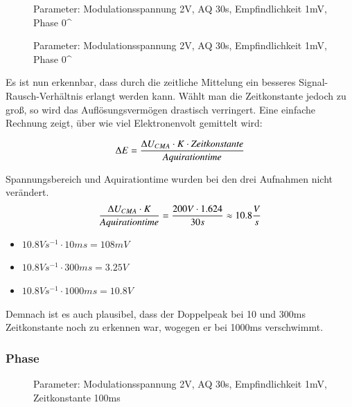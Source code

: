 		\begin{figure}[H]
			\center
			
			\caption{\centering Parameter: Modulationsspannung 2V, AQ 30s, Empfindlichkeit 1mV, Phase 0^\circ}
		\end{figure}

		\begin{figure}[H]
			\center
			
			\caption{\centering Parameter: Modulationsspannung 2V, AQ 30s, Empfindlichkeit 1mV, Phase 0^\circ}
		\end{figure}

		Es ist nun erkennbar, dass durch die zeitliche Mittelung ein besseres Signal-Rausch-Verhältnis erlangt werden kann.
		Wählt man die Zeitkonstante jedoch zu groß, so wird das Auflösungsvermögen drastisch verringert. Eine einfache Rechnung zeigt, über wie viel Elektronenvolt gemittelt wird:

		\begin{equation*}
			\Delta E = \dfrac{\Delta U_{CMA} \cdot K \cdot \text{\itshape Zeitkonstante}}{\text{\itshape Aquirationtime}}
		\end{equation*}
	

		Spannungsbereich und Aquirationtime wurden bei den drei Aufnahmen nicht verändert.
		\begin{equation*}
			\dfrac{\Delta U_{CMA} \cdot K}{\text{\itshape Aquirationtime}} = \dfrac{200V \cdot 1.624}{30s} \approx 10.8 \dfrac{V}{s}
		\end{equation*}
		\begin{itemize}
			\item 
				$10.8 Vs^{-1} \cdot 10ms = 108mV$
			\item 
				$10.8 Vs^{-1} \cdot 300ms = 3.25V$
			\item 
				$10.8 Vs^{-1} \cdot 1000ms = 10.8V$
		\end{itemize}
		Demnach ist es auch plausibel, dass der Doppelpeak bei 10 und 300ms Zeitkonstante noch zu erkennen war, wogegen er bei 1000ms verschwimmt.


	\subsubsection{Phase} %
	\label{ssub:phase}
	
		\begin{figure}[H]
			\center
			
			\caption{\centering Parameter: Modulationsspannung 2V, AQ 30s, Empfindlichkeit 1mV, Zeitkonstante 100ms}
		\end{figure}

